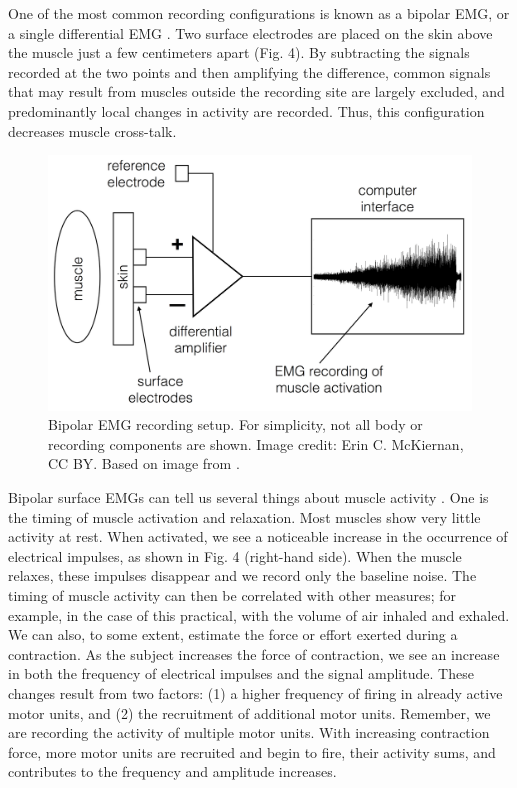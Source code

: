\documentclass{article}
\begin{document}
One of the most common recording configurations is known as a bipolar EMG, or a single differential EMG \citep{garcia2011surface}. Two surface electrodes are placed on the skin above the muscle just a few centimeters apart (Fig. 4). By subtracting the signals recorded at the two points and then amplifying the difference, common signals that may result from muscles outside the recording site are largely excluded, and predominantly local changes in activity are recorded. Thus, this configuration decreases muscle cross-talk.

\begin{figure}[!htbp]
\centering
\includegraphics[width=0.7\linewidth]{files/EPpXta8zJdzN048lz8AR-1abdd02c68bc02e2edd2b12303cfbaa1.png}
\caption[]{Bipolar EMG recording setup. For simplicity, not all body or recording components are shown. Image credit: Erin C. McKiernan, CC BY. Based on image from \citet{garcia2011surface}.}
\label{v1wNOU63Kz}
\end{figure}

Bipolar surface EMGs can tell us several things about muscle activity \citep{garcia2011surface}. One is the timing of muscle activation and relaxation. Most muscles show very little activity at rest. When activated, we see a noticeable increase in the occurrence of electrical impulses, as shown in Fig. 4 (right-hand side). When the muscle relaxes, these impulses disappear and we record only the baseline noise. The timing of muscle activity can then be correlated with other measures; for example, in the case of this practical, with the volume of air inhaled and exhaled. We can also, to some extent, estimate the force or effort exerted during a contraction. As the subject increases the force of contraction, we see an increase in both the frequency of electrical impulses and the signal amplitude. These changes result from two factors: (1) a higher frequency of firing in already active motor units, and (2) the recruitment of additional motor units. Remember, we are recording the activity of multiple motor units. With increasing contraction force, more motor units are recruited and begin to fire, their activity sums, and contributes to the frequency and amplitude increases.
\end{document}
